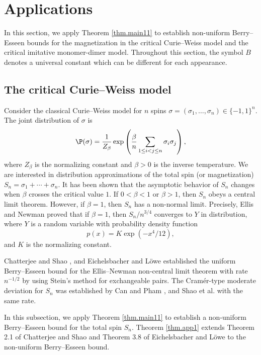 	
	
	
	
	
	\section{Applications}\label{sec.appl}
	
	In this section, we apply Theorem \ref{thm.main11} to establish non-uniform 
	Berry--Esseen bounds for the magnetization in the critical Curie--Weiss model and
the critical imitative monomer-dimer model.
	Throughout this section, the symbol $B$ denotes a universal constant
	which can be different for each appearance. 
	
	
	\subsection{The critical Curie--Weiss model}\label{subsec.cw}
	
	Consider the classical Curie--Weiss model
	for $n$ spins $\sigma=(\sigma_1,\ldots,\sigma_n)\in\{-1,1\}^n$. The joint distribution of $\sigma$ is
	\[\P(\sigma)= \dfrac{1}{Z_\beta}
	\exp\left(\dfrac{\beta}{n}\sum_{1\le i<j\le n}\sigma_i\sigma_j \right),
	\]
	where $Z_\beta$ is the normalizing constant and $\beta>0$ is the inverse temperature.
	We are interested in distribution approximations 
	of the total spin (or magnetization) $S_n=\sigma_1+\cdots+\sigma_n$.
	It has been shown that the asymptotic behavior of $S_n$ changes when $\beta$ 
	crosses the critical value $1$. 
	If $0<\beta<1$ or $\beta>1$, then $S_n$ obeys a central limit theorem. However, if $\beta=1$, then $S_n$
	has a non-normal limit. Precisely,
	Ellis and Newman \cite{ellis1978limit}  proved that if $\beta=1$, then $S_n/n^{3/4}$ converges to $Y$
	in distribution, where $Y$ is a random variable with probability density function 
	\begin{equation}\label{ap3}
		p(x)= K\exp(-x^4/12),
	\end{equation}
	and $K$ is the normalizing constant.
	
	Chatterjee and Shao \cite{chatterjee2011nonnormal}, and Eichelsbacher and L\"{o}we \cite{eichelsbacher2010stein} established
	the uniform Berry--Esseen bound for the Ellis--Newman non-central limit theorem
	with rate $n^{-1/2}$ by using Stein's method for exchangeable pairs.
	The Cram\'{e}r-type moderate deviation for $S_n$ was established by
	Can and Pham \cite{can2017cramer}, and Shao et al. \cite{shao2021cramer}
	with the same rate.
	
	
	In this subsection, we apply Theorem \ref{thm.main11} to establish a non-uniform 
	Berry--Esseen bound for the total spin $S_n$. Theorem \ref{thm.app1} extends Theorem 2.1
	of Chatterjee and Shao \cite{chatterjee2011nonnormal} and Theorem 3.8 of Eichelsbacher and L\"{o}we \cite{eichelsbacher2010stein}
	to the non-uniform Berry--Esseen bound.
	
